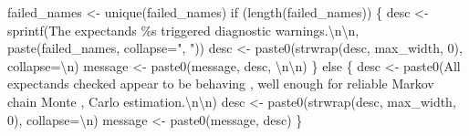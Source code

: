 \documentclass[
  letterpaper,
  DIV=11,
  numbers=noendperiod]{scrartcl}
\newenvironment{Shaded}{\begin{snugshade}}{\end{snugshade}}
\newcommand{\AttributeTok}[1]{\textcolor[rgb]{0.40,0.45,0.13}{#1}}
\newcommand{\ControlFlowTok}[1]{\textcolor[rgb]{0.00,0.23,0.31}{#1}}
\newcommand{\DecValTok}[1]{\textcolor[rgb]{0.68,0.00,0.00}{#1}}
\newcommand{\FunctionTok}[1]{\textcolor[rgb]{0.28,0.35,0.67}{#1}}
\newcommand{\NormalTok}[1]{\textcolor[rgb]{0.00,0.23,0.31}{#1}}
\newcommand{\OtherTok}[1]{\textcolor[rgb]{0.00,0.23,0.31}{#1}}
\newcommand{\SpecialCharTok}[1]{\textcolor[rgb]{0.37,0.37,0.37}{#1}}
\newcommand{\StringTok}[1]{\textcolor[rgb]{0.13,0.47,0.30}{#1}}
\begin{document}
\begin{Shaded}
\begin{Highlighting}[]
\NormalTok{  failed\_names }\OtherTok{\textless{}{-}} \FunctionTok{unique}\NormalTok{(failed\_names)}
  \ControlFlowTok{if}\NormalTok{ (}\FunctionTok{length}\NormalTok{(failed\_names)) \{}
\NormalTok{    desc }\OtherTok{\textless{}{-}} 
      \FunctionTok{sprintf}\NormalTok{(}\StringTok{\textquotesingle{}The expectands \%s triggered diagnostic warnings.}\SpecialCharTok{\textbackslash{}n\textbackslash{}n}\StringTok{\textquotesingle{}}\NormalTok{,}
              \FunctionTok{paste}\NormalTok{(failed\_names, }\AttributeTok{collapse=}\StringTok{", "}\NormalTok{))}
\NormalTok{    desc }\OtherTok{\textless{}{-}} \FunctionTok{paste0}\NormalTok{(}\FunctionTok{strwrap}\NormalTok{(desc, max\_width, }\DecValTok{0}\NormalTok{), }\AttributeTok{collapse=}\StringTok{\textquotesingle{}}\SpecialCharTok{\textbackslash{}n}\StringTok{\textquotesingle{}}\NormalTok{)}
\NormalTok{    message }\OtherTok{\textless{}{-}} \FunctionTok{paste0}\NormalTok{(message, desc, }\StringTok{\textquotesingle{}}\SpecialCharTok{\textbackslash{}n\textbackslash{}n}\StringTok{\textquotesingle{}}\NormalTok{)}
\NormalTok{  \} }\ControlFlowTok{else}\NormalTok{ \{}
\NormalTok{    desc }\OtherTok{\textless{}{-}} \FunctionTok{paste0}\NormalTok{(}\StringTok{\textquotesingle{}All expectands checked appear to be behaving \textquotesingle{}}\NormalTok{,}
                   \StringTok{\textquotesingle{}well enough for reliable Markov chain Monte \textquotesingle{}}\NormalTok{,}
                   \StringTok{\textquotesingle{}Carlo estimation.}\SpecialCharTok{\textbackslash{}n\textbackslash{}n}\StringTok{\textquotesingle{}}\NormalTok{)}
\NormalTok{    desc }\OtherTok{\textless{}{-}} \FunctionTok{paste0}\NormalTok{(}\FunctionTok{strwrap}\NormalTok{(desc, max\_width, }\DecValTok{0}\NormalTok{), }\AttributeTok{collapse=}\StringTok{\textquotesingle{}}\SpecialCharTok{\textbackslash{}n}\StringTok{\textquotesingle{}}\NormalTok{)}
\NormalTok{    message }\OtherTok{\textless{}{-}} \FunctionTok{paste0}\NormalTok{(message, desc)}
\NormalTok{  \}}


\end{Highlighting}
\end{Shaded}
\end{document}
